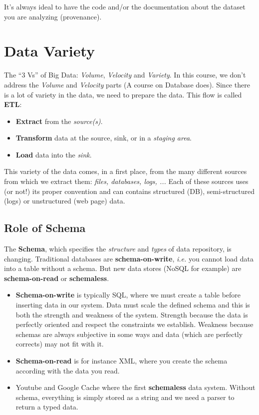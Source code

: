 \documentclass[a4paper,11pt,twoside]{article}
\begin{document}
It's always ideal to have the code and/or the documentation about the dataset you are analyzing (provenance).
 
\section{Data Variety}

The ``3 Vs'' of Big Data: {\it Volume}, {\it Velocity} and {\it Variety}. In this course, we don't address the {\it Volume} and {\it Velocity} parts (A course on Database does). Since there is a lot of variety in the data, we need to prepare the data. This flow is called {\bf ETL}:
\begin{itemize}
 \item {\bf Extract} from the {\it source(s)}.
 \item {\bf Transform} data at the source, sink, or in a {\it staging area}.
 \item {\bf Load} data into the {\it sink}.  
\end{itemize}
This variety of the data comes, in a first place, from the many different sources from which we extract them: {\it files, databases, logs, ... } Each of these sources uses (or not!) its proper convention and can contains structured (DB), semi-structured (logs) or unstructured (web page) data. 

\subsection{Role of Schema}
The {\bf Schema}, which specifies the {\it structure} and {\it types} of data repository, is changing. Traditional databases are {\bf schema-on-write}, {\it i.e.} you cannot load data into a table without a schema. But new data stores (NoSQL for example) are {\bf schema-on-read} or {\bf schemaless}. 

\begin{itemize}
	\item {\bf Schema-on-write} is typically SQL, where we must create a table before inserting data in our system. Data must scale the defined schema and this is both the strength and weakness of the system. Strength because the data is perfectly oriented and respect the constraints we establish. Weakness because schemas are always subjective in some ways and data (which are perfectly corrects) may not fit with it. 
	\item {\bf Schema-on-read} is for instance XML, where you create the schema according with the data you read.
	\item Youtube and Google Cache where the first {\bf schemaless} data system. Without schema, everything is simply stored as a string and we need a parser to return a typed data.
\end{itemize}
\end{document}
